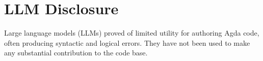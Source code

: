 \section{LLM Disclosure}

Large language models (LLMs) proved of limited utility for authoring Agda code, often producing syntactic and logical errors. They have not been used to make any substantial contribution to the code base.

